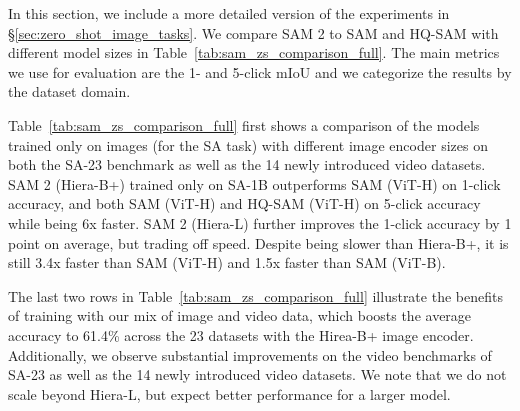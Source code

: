 \documentclass[]{fairmeta}
\newcommand{\secref}[1]{\S\ref{#1}}
\newcommand{\tabref}[1]{Table~\ref{#1}}
\begin{document}
In this section, we include a more detailed version of the experiments in \secref{sec:zero_shot_image_tasks}. We compare SAM 2 to SAM and HQ-SAM with different model sizes in \tabref{tab:sam_zs_comparison_full}. The main metrics we use for evaluation are the 1- and 5-click mIoU and we categorize the results by the dataset domain.

\tabref{tab:sam_zs_comparison_full} first shows a comparison of the models trained only on images (for the SA task) with different image encoder sizes on both the SA-23 benchmark as well as the 14 newly introduced video datasets. SAM 2 (Hiera-B+) trained only on SA-1B outperforms SAM (ViT-H) on 1-click accuracy, and both SAM (ViT-H) and HQ-SAM (ViT-H) on 5-click accuracy while being 6x faster. SAM 2 (Hiera-L) further improves the 1-click accuracy by 1 point on average, but trading off speed. Despite being slower than Hiera-B+, it is still 3.4x faster than SAM (ViT-H) and 1.5x faster than SAM (ViT-B).

The last two rows in \tabref{tab:sam_zs_comparison_full} illustrate the benefits of training with our mix of image and video data, which boosts the average accuracy to 61.4\% across the 23 datasets with the Hirea-B+ image encoder. Additionally, we observe substantial improvements on the video benchmarks of SA-23 as well as the 14 newly introduced video datasets. We note that we do not scale beyond Hiera-L, but expect better performance for a larger model.
\end{document}
